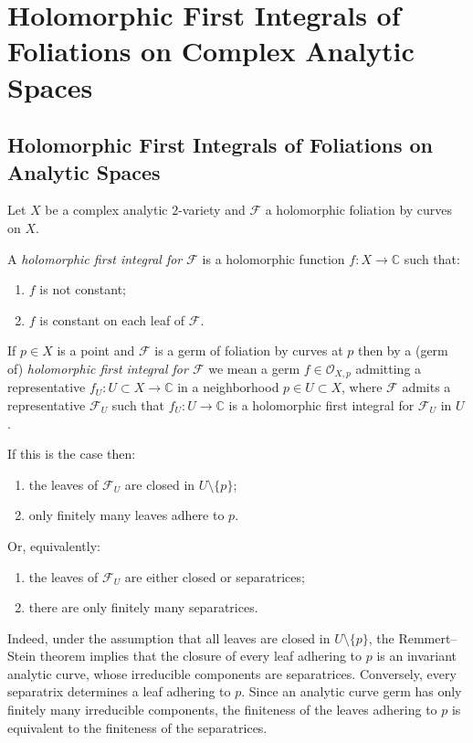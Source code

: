 \documentclass[11pt,twoside]{amsart}
\newcommand{\C}{\mathbb C}
\newcommand{\OO}{\mathcal O}
\newcommand{\F}{\mathcal F}
\theoremstyle{definition}
\begin{document}
\section{Holomorphic First Integrals of Foliations on Complex Analytic Spaces}\label{sec:holomorphic}

\subsection{Holomorphic First Integrals of Foliations on Analytic Spaces}
Let $X$ be a complex analytic $2$-variety and $\F$ a holomorphic foliation by curves on $X$.

A \textit{holomorphic first integral for $\F$} is a holomorphic function $f\colon X\to\C$ such that:
\begin{enumerate}
\item[(i)] $f$ is not constant;
\item[(ii)] $f$ is constant on each leaf of $\F$.
\end{enumerate}

If $p\in X$ is a point and $\F$ is a germ of foliation by curves at $p$ then by a (germ of) \textit{holomorphic first integral for $\F$} we mean a germ $f\in\OO_{X,p}$
admitting a representative
$f_U\colon U\subset X\to\C$ in a neighborhood $p\in U\subset X$, where $\F$ admits a representative $\F_U$ such that $f_U\colon U\to\C$ is a holomorphic first integral for $\F_U$ in $U$.

If this is the case then:
\begin{enumerate}
\item[(a)] the leaves of $\F_U$ are closed in $U\setminus\{p\}$;
\item[(b)] only finitely many leaves adhere to $p$.
\end{enumerate}

Or, equivalently:
\begin{enumerate}
\item[(a')] the leaves of $\F_U$ are either closed or separatrices;
\item[(b')] there are only finitely many separatrices.
\end{enumerate}

Indeed, under the assumption that all leaves are closed in $U\setminus\{p\}$, the Remmert--Stein theorem implies that the closure of every leaf adhering to $p$ is an invariant analytic curve, whose irreducible components are separatrices. Conversely, every separatrix determines a leaf adhering to $p$. Since an analytic curve germ has only finitely many irreducible components, the finiteness of the leaves adhering to $p$ is equivalent to the finiteness of the separatrices.
\end{document}
